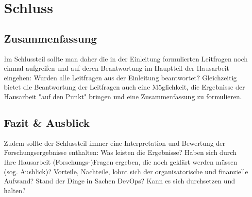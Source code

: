 \chapter{Schluss}

\section{Zusammenfassung}

Im Schlussteil sollte man daher die in der Einleitung formulierten Leitfragen noch einmal aufgreifen und auf deren Beantwortung im Hauptteil der Hausarbeit eingehen: Wurden alle Leitfragen aus der Einleitung beantwortet?
Gleichzeitig bietet die Beantwortung der Leitfragen auch eine Möglichkeit, die Ergebnisse der Hausarbeit "auf den Punkt" bringen und eine Zusammenfassung zu formulieren.

\section{Fazit \& Ausblick}

Zudem sollte der Schlussteil immer eine Interpretation und Bewertung der Forschungsergebnisse enthalten: Was leisten die Ergebnisse? Haben sich durch Ihre Hausarbeit (Forschungs-)Fragen ergeben, die noch geklärt werden müssen (sog. Ausblick)?
Vorteile, Nachteile, lohnt sich der organisatorische und finanzielle Aufwand?
Stand der Dinge in Sachen DevOps? Kann es sich durchsetzen und halten?


